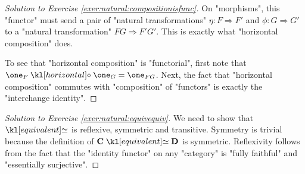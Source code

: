 \documentclass[main.tex]{subfiles}
\begin{document}
\begin{proof}[Solution to Exercise \ref{exer:natural:compositionisfunc}]\label{soln:natural:compositionisfunc}%
    On "morphisms", this "functor" must send a pair of "natural transformations" $\eta: F \Rightarrow F'$ and $\phi: G \Rightarrow G'$ to a "natural transformation" $FG \Rightarrow F'G'$. This is exactly what "horizontal composition" does.
    
    To see that "horizontal composition" is "functorial", first note that $\one_F \horcomp \one_G = \one_{FG}$. Next, the fact that "horizontal composition" commutes with "composition" of "functors" is exactly the "interchange identity".
\end{proof}
\begin{proof}[Solution to Exercise \ref{exer:natural:equivequiv}]\label{soln:natural:equivequiv}
    We need to show that $\eqCat$ is reflexive, symmetric and transitive. Symmetry is trivial because the definition of $\mathbf{C} \eqCat \mathbf{D}$ is symmetric. Reflexivity follows from the fact that the "identity functor" on any "category" is "fully faithful" and "essentially surjective".


\end{proof}
\end{document}
